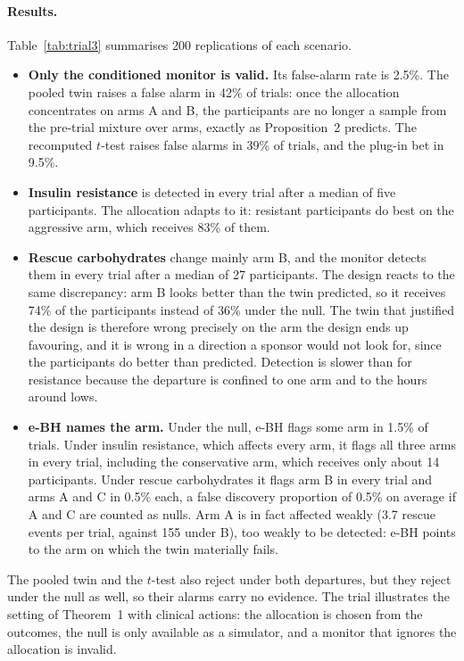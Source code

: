 \documentclass[11pt]{article}
\theoremstyle{remark}
\begin{document}
\paragraph{Results.} Table~\ref{tab:trial3} summarises 200 replications of
each scenario.
\begin{itemize}
  \item \textbf{Only the conditioned monitor is valid.} Its false-alarm rate is
        2.5\%. The pooled twin raises a false alarm in 42\% of trials: once the
        allocation concentrates on arms A and B, the participants are no longer
        a sample from the pre-trial mixture over arms, exactly as
        Proposition~2 predicts. The recomputed $t$-test
        raises false alarms in 39\% of trials, and the plug-in bet in 9.5\%.
  \item \textbf{Insulin resistance} is detected in every trial after a median
        of five participants. The allocation adapts to it: resistant
        participants do best on the aggressive arm, which receives 83\% of
        them.
  \item \textbf{Rescue carbohydrates} change mainly arm B, and the monitor
        detects them in every trial after a median of 27 participants. The
        design reacts to the same discrepancy: arm B looks better than the
        twin predicted, so it receives 74\% of the participants instead of
        36\% under the null. The twin that justified the design is therefore
        wrong precisely on the arm the design ends up favouring, and it is
        wrong in a direction a sponsor would not look for, since the
        participants do better than predicted. Detection is slower than for
        resistance because the departure is confined to one arm and to the
        hours around lows.
  \item \textbf{e-BH names the arm.} Under the null, e-BH flags some arm in
        1.5\% of trials. Under insulin resistance, which affects every arm, it
        flags all three arms in every trial, including the conservative arm,
        which receives only about 14 participants. Under rescue carbohydrates
        it flags arm B in every trial and arms A and C in 0.5\% each, a false
        discovery proportion of 0.5\% on average if A and C are counted as
        nulls. Arm A is in fact affected weakly (3.7 rescue events per trial,
        against 155 under B), too weakly to be detected: e-BH points to the
        arm on which the twin materially fails.
\end{itemize}
The pooled twin and the $t$-test also reject under both departures, but they
reject under the null as well, so their alarms carry no evidence. The trial
illustrates the setting of Theorem~1 with clinical actions: the
allocation is chosen from the outcomes, the null is only available as a
simulator, and a monitor that ignores the allocation is invalid.
\end{document}
